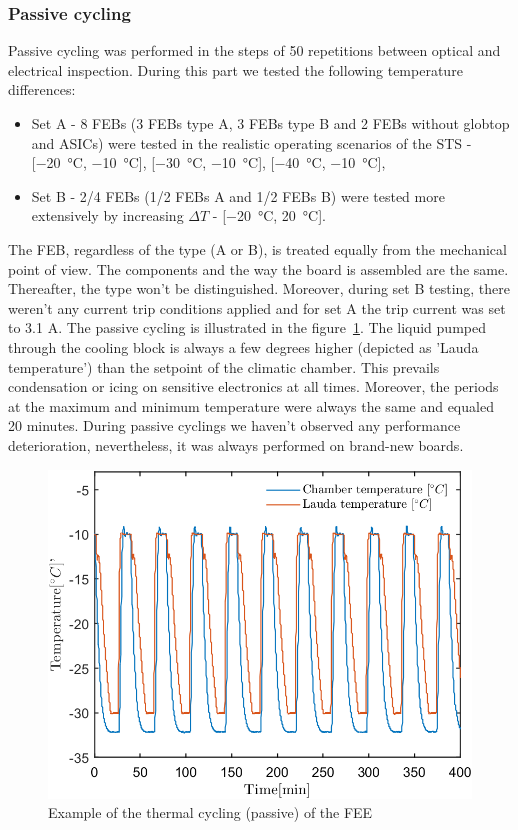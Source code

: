 \subsubsection{Passive cycling}
Passive cycling was performed in the steps of 50 repetitions between optical and electrical inspection. During this part we tested the following temperature differences:
\begin{itemize}
    \item Set A - 8 \glspl{FEB} (3 \glspl{FEB} type A, 3 \glspl{FEB} type B and 2 \glspl{FEB} without globtop and \glspl{ASIC}) were tested in the realistic operating scenarios of the \gls{STS} - [\SI{-20}{\celsius}, \SI{-10}{\celsius}], [\SI{-30}{\celsius}, \SI{-10}{\celsius}], [\SI{-40}{\celsius}, \SI{-10}{\celsius}],
    \item Set B - 2/4 \glspl{FEB} (1/2 \glspl{FEB} A and 1/2 \glspl{FEB} B) were tested more extensively by increasing $\Delta T$ - [\SI{-20}{\celsius}, \SI{20}{\celsius}].
\end{itemize}
The \gls{FEB}, regardless of the type (A or B), is treated equally from the mechanical point of view. The components and the way the board is assembled are the same. Thereafter, the type won't be distinguished. Moreover, during set B testing, there weren't any current trip conditions applied and for set A the trip current was set to 3.1 A. The passive cycling is illustrated in the figure~\ref{fig_passive_cycling}. The liquid pumped through the cooling block is always a few degrees higher (depicted as 'Lauda temperature') than the setpoint of the climatic chamber. This prevails condensation or icing on sensitive electronics at all times. Moreover, the periods at the maximum and minimum temperature were always the same and equaled 20 minutes. During passive cyclings we haven't observed any performance deterioration, nevertheless, it was always performed on brand-new boards.
\begin{figure}[!h]
\centering
\includegraphics[width=0.55\columnwidth]{Chapter4/images/active_cycling.png}
\caption{Example of the thermal cycling (passive) of the FEE}
\label{fig_passive_cycling}
\end{figure}

